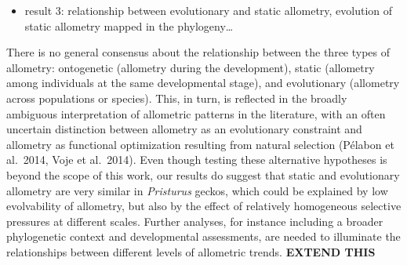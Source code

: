 \documentclass[
  11pt,
]{article}
\providecommand{\tightlist}{%
  \setlength{\itemsep}{0pt}\setlength{\parskip}{0pt}}
\begin{document}
\begin{itemize}
\tightlist
\item
  result 3: relationship between evolutionary and static allometry,
  evolution of static allometry mapped in the phylogeny\ldots{}
\end{itemize}

There is no general consensus about the relationship between the three
types of allometry: ontogenetic (allometry during the development),
static (allometry among individuals at the same developmental stage),
and evolutionary (allometry across populations or species). This, in
turn, is reflected in the broadly ambiguous interpretation of allometric
patterns in the literature, with an often uncertain distinction between
allometry as an evolutionary constraint and allometry as functional
optimization resulting from natural selection (Pélabon et al.~2014, Voje
et al.~2014). Even though testing these alternative hypotheses is beyond
the scope of this work, our results do suggest that static and
evolutionary allometry are very similar in \emph{Pristurus} geckos,
which could be explained by low evolvability of allometry, but also by
the effect of relatively homogeneous selective pressures at different
scales. Further analyses, for instance including a broader phylogenetic
context and developmental assessments, are needed to illuminate the
relationships between different levels of allometric trends.
\textbf{EXTEND THIS}
\end{document}
